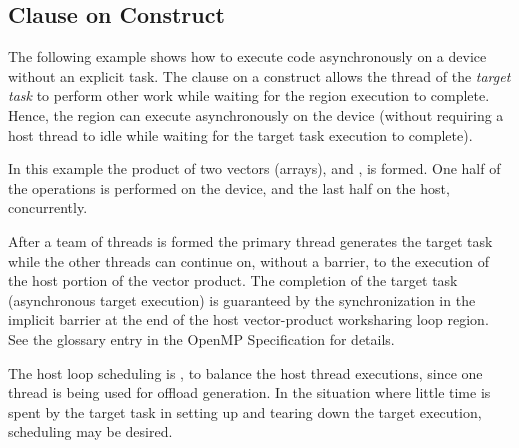 \subsection{ Clause on  Construct}
\label{subsec:target_nowait_clause}

The following example shows how to execute code asynchronously on a 
device without an explicit task. The  clause on a  
construct allows the thread of the \emph{target task} to perform other
work while waiting for the  region execution to complete. 
Hence, the  region can execute asynchronously on the 
device (without requiring a host thread to idle while waiting for 
the target task execution to complete).

In this example the product of two vectors (arrays), 
and , is formed. One half of the operations is performed
on the device, and the last half on the host, concurrently.

After a team of threads is formed the primary thread generates 
the target task while the other threads can continue on, without a barrier,
to the execution of the host portion of the vector product.
The completion of the target task (asynchronous target execution) is 
guaranteed by the synchronization in the implicit barrier at the end of the 
host vector-product worksharing loop region. See the  
glossary entry in the OpenMP Specification for details.

The host loop scheduling is , to balance the host thread executions, since 
one thread is being used for offload generation. In the situation where 
little time is spent by the target task in setting 
up and tearing down the target execution,  scheduling may be desired. 


